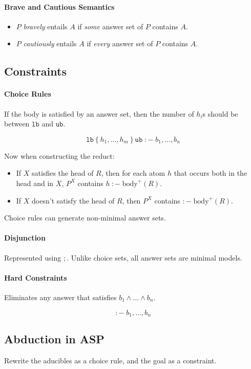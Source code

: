 \documentclass[twocolumn,english]{article}
\begin{document}
\paragraph{Brave and Cautious Semantics}
\begin{itemize}
\item $P$ \emph{bravely} entails $A$ if \emph{some} answer set of $P$
contains $A$.
\item $P$ \emph{cautiously} entails $A$ if \emph{every} answer set of
$P$ contains $A$.
\end{itemize}

\subsection{Constraints}

\paragraph{Choice Rules}

If the body is satisfied by an answer set, then the number of $h_{i}$s
should be between $\mathtt{lb}$ and $\mathtt{ub}$.

\[
\mathtt{lb}\left\{ h_{1},\dots,h_{m}\right\} \mathtt{ub}\;:-\;b_{1},\dots,b_{n}
\]

Now when constructing the reduct:
\begin{itemize}
\item If $X$ satisfies the head of $R$, then for each atom $h$ that occurs
both in the head and in $X$, $P^{X}$ contains $h\::-\;\text{body}^{+}\left(R\right)$.
\item If $X$ doesn't satisfy the head of $R$, then $P^{X}$ contains $:-\;\text{body}^{+}\left(R\right)$.
\end{itemize}
Choice rules can generate non-minimal answer sets.

\paragraph{Disjunction}

Represented using $;$. Unlike choice sets, all answer sets are minimal
models.

\paragraph{Hard Constraints}

Eliminates any answer that satisfies $b_{1}\land\dots\land b_{n}$.

\[
:-\;b_{1},\dots,b_{n}
\]

\subsection{Abduction in ASP}

Rewrite the aducibles as a choice rule, and the goal as a constraint.
\end{document}
